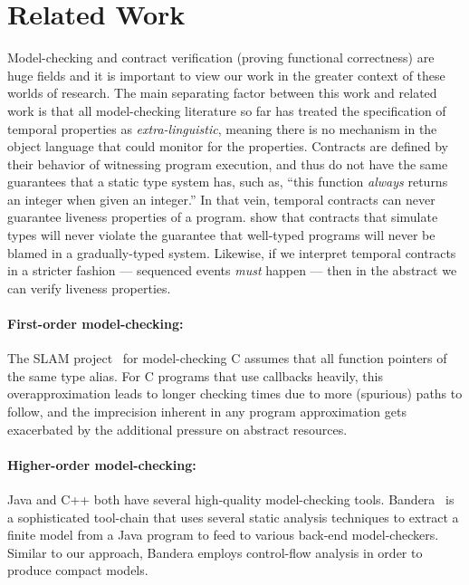 \documentclass[preprint,onecolumn,9pt]{sigplanconf} %
\begin{document}
\section{Related Work}

Model-checking and contract verification (proving functional correctness) are huge fields and it is important to view our work in the greater context of these worlds of research.
%
The main separating factor between this work and related work is that all model-checking literature so far has treated the specification of temporal properties as \emph{extra-linguistic}, meaning there is no mechanism in the object language that could monitor for the properties.
%
Contracts are defined by their behavior of witnessing program execution, and thus do not have the same guarantees that a static type system has, such as, ``this function \emph{always} returns an integer when given an integer.''
%
In that vein, temporal contracts can never guarantee liveness properties of a program.
%
\citet{ianjohnson:dthf:complete} show that contracts that simulate types will never violate the guarantee that well-typed programs will never be blamed in a gradually-typed system.
%
Likewise, if we interpret temporal contracts in a stricter fashion --- sequenced events \emph{must} happen --- then in the abstract we can verify liveness properties.

\paragraph{First-order model-checking:}
The SLAM project~\citep{ianjohnson:Ball:2002:SLP:503272.503274} for model-checking C assumes that all function pointers of the same type alias.
%
For C programs that use callbacks heavily, this overapproximation leads to longer checking times due to more (spurious) paths to follow, and the imprecision inherent in any program approximation gets exacerbated by the additional pressure on abstract resources.

\paragraph{Higher-order model-checking:}
Java and C++ both have several high-quality model-checking tools.
%
Bandera~\citep{ianjohnson:bandera} is a sophisticated tool-chain that uses several static analysis techniques to extract a finite model from a Java program to feed to various back-end model-checkers.
%
Similar to our approach, Bandera employs control-flow analysis in order to produce compact models.
\end{document}
